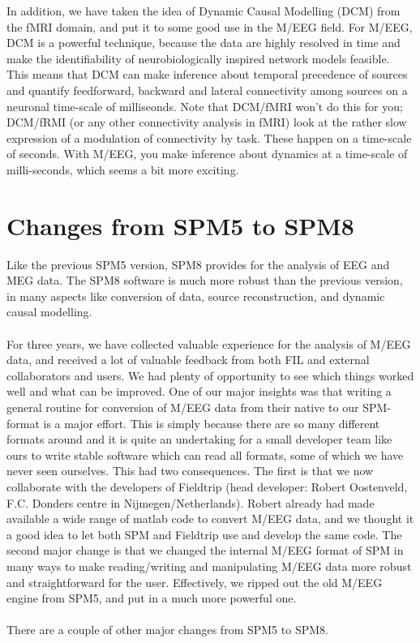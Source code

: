 In addition, we have taken the idea of Dynamic Causal Modelling (DCM)
from the fMRI domain, and put it to some good use in the M/EEG field. For
M/EEG, DCM is a powerful technique, because the data are highly
resolved in time and make the identifiability of neurobiologically
inspired network models feasible. This means that DCM can make
inference about temporal precedence of sources and quantify
feedforward, backward and lateral connectivity among sources on a
neuronal time-scale of milliseonds. Note that DCM/fMRI won't do this
for you; DCM/fRMI (or any other connectivity analysis in fMRI)
look at the rather slow expression of a modulation of connectivity by
task. These happen on a time-scale of seconds. With M/EEG, you make
inference about dynamics at a time-scale of milli-seconds, which seems
a bit more exciting.

\section{Changes from SPM5 to SPM8}
Like the previous SPM5 version, SPM8 provides for the analysis of EEG
and MEG data. The SPM8 software is much more robust than the previous
version, in many aspects like conversion of data, source
reconstruction, and dynamic causal modelling.
\\
\\
For three years, we have collected valuable experience
for the analysis of M/EEG data, and received a lot of valuable
feedback from both FIL and external collaborators and users. We had
plenty of opportunity to see which things worked well and what can be
improved. One of our major insights was that writing a general routine
for conversion of M/EEG data from their native to our SPM-format is a
major effort. This is simply because there are so many different
formats 
around and it is quite an undertaking for a small developer team like
ours to write stable software which can read all formats, some of
which we have never seen ourselves. This had two consequences. The
first is that we now collaborate with the developers of Fieldtrip
(head developer: Robert Oostenveld, F.C. Donders centre in
Nijmegen/Netherlands). Robert already had made available a wide range of
matlab code to convert M/EEG data, and we thought it a good idea to
let both SPM and Fieldtrip use and develop the same code. The second
major change is that we changed the internal M/EEG format of SPM in
many ways to make reading/writing and manipulating M/EEG data more
robust and straightforward for the user. Effectively, we ripped out
the old M/EEG engine from SPM5, and put in a much more powerful one.
\\
\\
There are a couple of other major changes from SPM5 to SPM8. 

